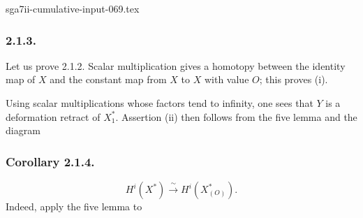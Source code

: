 \begin{filecontents*}{sga7ii-cumulative-input-069.tex}
\subsubsection*{2.1.3.}
Let us prove 2.1.2.  Scalar multiplication gives a homotopy between
the identity map of $X$ and the constant map from $X$ to $X$ with
value $O$; this proves (i).

Using scalar multiplications whose factors tend to infinity, one
sees that $Y$ is a deformation retract of $X_1^*$.  Assertion (ii)
then follows from the five lemma and the diagram
\begin{center}
\end{center}

\subsubsection*{Corollary 2.1.4.}
\[
H^i(X^*)\xrightarrow{\ \sim\ }H^i(X^*_{(O)}).
\]
Indeed, apply the five lemma to
\begin{center}
\end{center}


\end{filecontents*}
